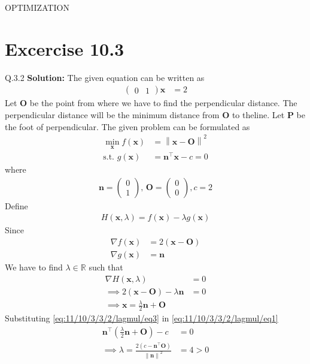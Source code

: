 \documentclass[12pt]{article}
\providecommand{\brak}[1]{\ensuremath{\left(#1\right)}}
\providecommand{\norm}[1]{\left\lVert#1\right\rVert}
\newcommand{\solution}{\noindent \textbf{Solution: }}
\newcommand{\myvec}[1]{\ensuremath{\begin{pmatrix}#1\end{pmatrix}}}
\let\vec\mathbf
\begin{document}
\begin{center}
\textbf\large{OPTIMIZATION}

\end{center}
\section*{Excercise 10.3}

Q.3.2 
\solution
The given equation can be written as
\begin{align}
	\label{eq:11/10/3/3/2/lagmul/eq1}
	\myvec{0&1}\vec{x} &= 2
\end{align}
Let $\vec{O}$ be the point from where we have to find the perpendicular distance. The perpendicular distance will be the minimum distance from $\vec{O}$ to theline. Let $\vec{P}$ be the foot of perpendicular. 
\fi
The given problem can be formulated as 
\begin{align}
	\min_{\vec{x}}f\brak{\vec{x}} &= \norm{\vec{x}-\vec{O}}^2\\
	\text{s.t. } g\brak{\vec{x}} &= \vec{n}^\top\vec{x}-c=0
	\label{eq:11/10/3/3/2/lagmul/eq1}
\end{align}
where
\begin{align}
	\vec{n} = \myvec{0\\1},\,
	\vec{O} = \myvec{0\\0},
	c = 2
\end{align}
Define
\begin{align}
	H\brak{\vec{x},\lambda} = f\brak{\vec{x}} - \lambda g\brak{\vec{x}}
\end{align}
Since
\begin{align}
	\nabla f\brak{\vec{x}} &= 2\brak{\vec{x}-\vec{O}}\\
	\nabla g\brak{\vec{x}} &= \vec{n}
\end{align}
We have to find $\lambda \in \mathbb{R}$ such that
\begin{align}
	\nabla H\brak{\vec{x},\lambda} &= 0\\
	\label{eq:11/10/3/3/2/lagmul/eq2}
	\implies 2\brak{\vec{x}-\vec{O}}-\lambda\vec{n} &= 0\\
	\label{eq:11/10/3/3/2/lagmul/eq3}
	\implies \vec{x} = \frac{\lambda}{2}\vec{n}+\vec{O}
\end{align}
Substituting \eqref{eq:11/10/3/3/2/lagmul/eq3} in \eqref{eq:11/10/3/3/2/lagmul/eq1}
\begin{align}
	\vec{n}^\top\brak{\frac{\lambda}{2}\vec{n}+\vec{O}} - c &= 0\\
	\implies \lambda = \frac{2\brak{c-\vec{n}^\top\vec{O}}}{\norm{\vec{n}}^2} &= 4 > 0
\end{align}
\end{document}
